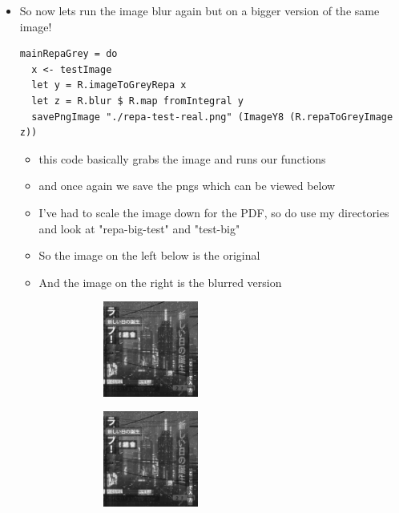 \documentclass{article}
\begin{document}
\begin{enumerate}
\begin{enumerate}
\begin{itemize}
\item So now lets run the image blur again but on a bigger version of the
same image!
\begin{verbatim}
mainRepaGrey = do
  x <- testImage
  let y = R.imageToGreyRepa x
  let z = R.blur $ R.map fromIntegral y
  savePngImage "./repa-test-real.png" (ImageY8 (R.repaToGreyImage z))
\end{verbatim}
\begin{itemize}
\item this code basically grabs the image and runs our functions
\item and once again we save the pngs which can be viewed below
\item I've had to scale the image down for the PDF, so do use my
directories and look at "repa-big-test" and "test-big"
\item So the image on the left below is the original
\item And the image on the right is the blurred version
\begin{figure}
  \centering
  \begin{subfigure}
    \centering
    \includegraphics[width=0.4\textwidth]{../data/test-big.png}
  \end{subfigure}%
  \begin{subfigure}
    \centering
    \includegraphics[width=0.4\textwidth]{../data/repa-big-test.png}
  \end{subfigure}
\end{figure}

\end{itemize}
\end{itemize}
\end{enumerate}
\end{enumerate}
\end{document}
